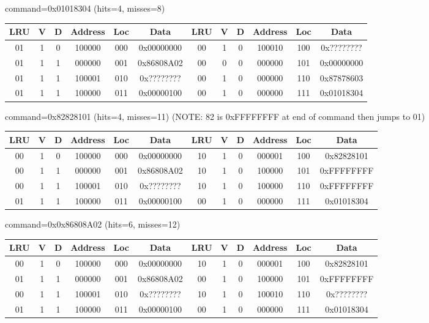 \begin{enumerate}
{    command=0x01018304 (hits=4, misses=8)

    \begin{tabular}{|c|c|c|c|c|c||c|c|c|c|c|c|} \hline
    LRU   & V & D & Address & Loc & Data       & LRU   & V & D & Address & Loc & Data        \\ \hline
    01    & 1 & 0 & 100000  & 000 & 0x00000000 & 00    & 1 & 0 & 100010  & 100 & 0x????????  \\ \hline
    01    & 1 & 1 & 000000  & 001 & 0x86808A02 & 00    & 0 & 0 & 000000  & 101 & 0x00000000  \\ \hline
    01    & 1 & 1 & 100001  & 010 & 0x???????? & 00    & 1 & 0 & 000000  & 110 & 0x87878603  \\ \hline
    01    & 1 & 1 & 100000  & 011 & 0x00000100 & 00    & 1 & 0 & 000000  & 111 & 0x01018304  \\ \hline
    \end{tabular}


    command=0x82828101 (hits=4, misses=11) (NOTE: 82 is 0xFFFFFFFF at end of command then jumps to 01)

    \begin{tabular}{|c|c|c|c|c|c||c|c|c|c|c|c|} \hline
    LRU   & V & D & Address & Loc & Data       & LRU   & V & D & Address & Loc & Data        \\ \hline
    00    & 1 & 0 & 100000  & 000 & 0x00000000 & 10    & 1 & 0 & 000001  & 100 & 0x82828101  \\ \hline
    00    & 1 & 1 & 000000  & 001 & 0x86808A02 & 10    & 1 & 0 & 100000  & 101 & 0xFFFFFFFF  \\ \hline
    00    & 1 & 1 & 100001  & 010 & 0x???????? & 10    & 1 & 0 & 100000  & 110 & 0xFFFFFFFF  \\ \hline
    01    & 1 & 1 & 100000  & 011 & 0x00000100 & 00    & 1 & 0 & 000000  & 111 & 0x01018304  \\ \hline
    \end{tabular}


    command=0x0x86808A02 (hits=6, misses=12)

    \begin{tabular}{|c|c|c|c|c|c||c|c|c|c|c|c|} \hline
    LRU   & V & D & Address & Loc & Data       & LRU   & V & D & Address & Loc & Data        \\ \hline
    00    & 1 & 0 & 100000  & 000 & 0x00000000 & 10    & 1 & 0 & 000001  & 100 & 0x82828101  \\ \hline
    01    & 1 & 1 & 000000  & 001 & 0x86808A02 & 00    & 1 & 0 & 100000  & 101 & 0xFFFFFFFF  \\ \hline
    00    & 1 & 1 & 100001  & 010 & 0x???????? & 10    & 1 & 0 & 100010  & 110 & 0x????????  \\ \hline
    01    & 1 & 1 & 100000  & 011 & 0x00000100 & 00    & 1 & 0 & 000000  & 111 & 0x01018304  \\ \hline
    \end{tabular}


}
\end{enumerate}
